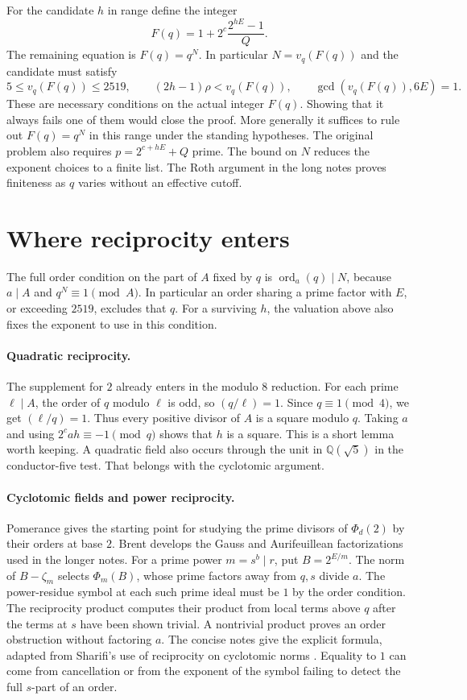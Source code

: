 \documentclass[11pt]{article}
\DeclareMathOperator{\ord}{ord}
\begin{document}
For the candidate $h$ in range define the integer
\[
 F(q)=1+2^c\frac{2^{hE}-1}{Q}.
\]
The remaining equation is $F(q)=q^N$. In particular $N=v_q(F(q))$
and the candidate must satisfy
\[
 5\le v_q(F(q))\le2519,\qquad
 (2h-1)\rho<v_q(F(q)),\qquad \gcd(v_q(F(q)),6E)=1.
\]
These are necessary conditions on the actual integer $F(q)$.
Showing that it always fails one of them would close the proof.
More generally it suffices to rule out $F(q)=q^N$ in this range
under the standing hypotheses. The original problem also requires
$p=2^{c+hE}+Q$ prime. The bound on $N$ reduces the exponent choices
to a finite list. The Roth argument in the long notes proves
finiteness as $q$ varies without an effective cutoff.

\section{Where reciprocity enters}

The full order condition on the part of $A$ fixed by $q$ is
$\ord_a(q)\mid N$, because $a\mid A$ and $q^N\equiv1\pmod A$.
In particular an order sharing a prime factor with $E$, or exceeding
$2519$, excludes that $q$. For a surviving $h$, the valuation above
also fixes the exponent to use in this condition.

\paragraph{Quadratic reciprocity.}
The supplement for $2$ already enters in the modulo $8$ reduction.
For each prime $\ell\mid A$, the order of $q$ modulo $\ell$ is odd,
so $(q/\ell)=1$. Since $q\equiv1\pmod4$, we get $(\ell/q)=1$.
Thus every positive divisor of $A$ is a square modulo $q$. Taking
$a$ and using $2^cah\equiv-1\pmod q$ shows that $h$ is a square.
This is a short lemma worth keeping. A quadratic field also occurs
through the unit in $\mathbb Q(\sqrt5)$ in the conductor-five test.
That belongs with the cyclotomic argument.

\paragraph{Cyclotomic fields and power reciprocity.}
Pomerance \cite[\S2]{PomCycl} gives the starting point for studying
the prime divisors of $\Phi_d(2)$ by their orders at base $2$.
Brent \cite[\S\S2--3]{Brent} develops the Gauss and Aurifeuillean
factorizations used in the longer notes.
For a prime power $m=s^b\mid r$, put $B=2^{E/m}$.
The norm of $B-\zeta_m$ selects $\Phi_m(B)$, whose prime factors
away from $q,s$ divide $a$. The power-residue symbol at each such
prime ideal must be $1$ by the order condition. The reciprocity
product computes their product from local terms above $q$
after the terms at $s$ have been shown trivial. A nontrivial product
proves an order obstruction without factoring $a$. The concise
notes give the explicit formula, adapted from Sharifi's use of
reciprocity on cyclotomic norms \cite[\S3, (5)]{SharifiCycl}.
Equality to $1$ can come from cancellation or from the exponent
of the symbol failing to detect the full $s$-part of an order.
\end{document}
